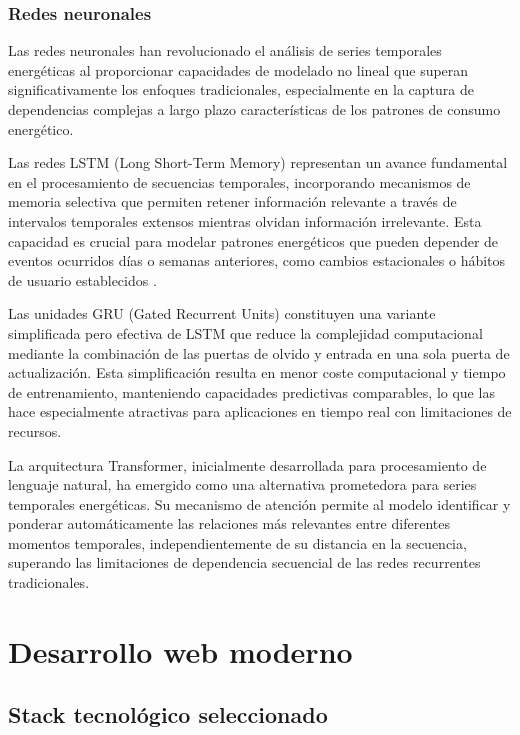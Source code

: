 \subsubsection{Redes neuronales}

Las redes neuronales han revolucionado el análisis de series temporales energéticas al proporcionar capacidades de modelado no lineal que superan significativamente los enfoques tradicionales, especialmente en la captura de dependencias complejas a largo plazo características de los patrones de consumo energético.

Las redes LSTM (Long Short-Term Memory) representan un avance fundamental en el procesamiento de secuencias temporales, incorporando mecanismos de memoria selectiva que permiten retener información relevante a través de intervalos temporales extensos mientras olvidan información irrelevante. Esta capacidad es crucial para modelar patrones energéticos que pueden depender de eventos ocurridos días o semanas anteriores, como cambios estacionales o hábitos de usuario establecidos \cite{shi2018deep}.

Las unidades GRU (Gated Recurrent Units) constituyen una variante simplificada pero efectiva de LSTM que reduce la complejidad computacional mediante la combinación de las puertas de olvido y entrada en una sola puerta de actualización. Esta simplificación resulta en menor coste computacional y tiempo de entrenamiento, manteniendo capacidades predictivas comparables, lo que las hace especialmente atractivas para aplicaciones en tiempo real con limitaciones de recursos.

La arquitectura Transformer, inicialmente desarrollada para procesamiento de lenguaje natural, ha emergido como una alternativa prometedora para series temporales energéticas. Su mecanismo de atención permite al modelo identificar y ponderar automáticamente las relaciones más relevantes entre diferentes momentos temporales, independientemente de su distancia en la secuencia, superando las limitaciones de dependencia secuencial de las redes recurrentes tradicionales.

\section{Desarrollo web moderno}

\subsection{Stack tecnológico seleccionado}

